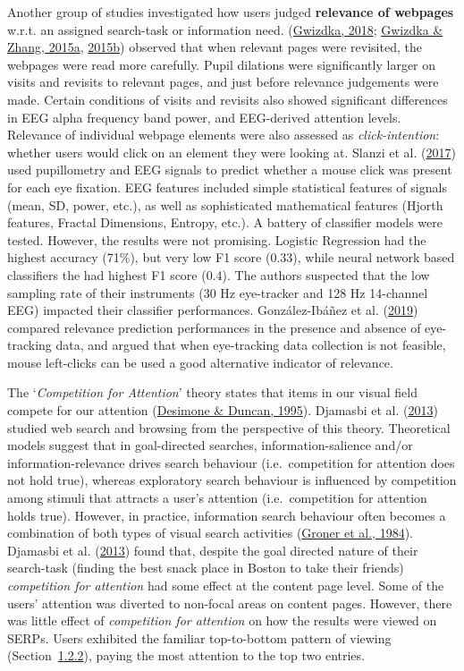 \documentclass[a4paper, nobind]{templates/ociamthesis}
\begin{document}
Another group of studies investigated how users judged \textbf{relevance of
webpages} w.r.t. an assigned search-task or information need.
(\protect\hyperlink{ref-74}{Gwizdka, 2018}; \protect\hyperlink{ref-48}{Gwizdka \& Zhang, 2015a}, \protect\hyperlink{ref-47}{2015b}) observed that when relevant pages were revisited, the
webpages were read more carefully. Pupil dilations were significantly
larger on visits and revisits to relevant pages, and just before
relevance judgements were made. Certain conditions of visits and
revisits also showed significant differences in EEG alpha frequency band
power, and EEG-derived attention levels. Relevance of individual webpage
elements were also assessed as \emph{click-intention}: whether users would
click on an element they were looking at. Slanzi et al. (\protect\hyperlink{ref-69}{2017}) used pupillometry and EEG
signals to predict whether a mouse click was present for each eye
fixation. EEG features included simple statistical features of signals
(mean, SD, power, etc.), as well as sophisticated mathematical features
(Hjorth features, Fractal Dimensions, Entropy, etc.). A battery of
classifier models were tested. However, the results were not promising.
Logistic Regression had the highest accuracy (71\%), but very low F1
score (0.33), while neural network based classifiers the had highest F1
score (0.4). The authors suspected that the low sampling rate of their
instruments (30 Hz eye-tracker and 128 Hz 14-channel EEG) impacted their
classifier performances. González-Ibáñez et al. (\protect\hyperlink{ref-81}{2019}) compared relevance prediction performances
in the presence and absence of eye-tracking data, and argued that when
eye-tracking data collection is not feasible, mouse left-clicks can be
used a good alternative indicator of relevance.

The `\emph{Competition for Attention}' theory states that items in our visual
field compete for our attention (\protect\hyperlink{ref-desimone1995neural}{Desimone \& Duncan, 1995}). Djamasbi et al. (\protect\hyperlink{ref-30}{2013}) studied web
search and browsing from the perspective of this theory. Theoretical
models suggest that in goal-directed searches, information-salience
and/or information-relevance drives search behaviour (i.e.~competition
for attention does not hold true), whereas exploratory search behaviour
is influenced by competition among stimuli that attracts a user's
attention (i.e.~competition for attention holds true). However, in
practice, information search behaviour often becomes a combination of
both types of visual search activities (\protect\hyperlink{ref-groner1984looking}{Groner et al., 1984}). Djamasbi et al. (\protect\hyperlink{ref-30}{2013}) found
that, despite the goal directed nature of their search-task (finding the
best snack place in Boston to take their friends) \emph{competition for
attention} had some effect at the content page level. Some of the users'
attention was diverted to non-focal areas on content pages. However,
there was little effect of \emph{competition for attention} on how the
results were viewed on SERPs. Users exhibited the familiar top-to-bottom
pattern of viewing
(Section~\protect\hyperlink{sec:bg_search_list}{1.2.2}), paying the most attention to the top
two entries.
\end{document}
